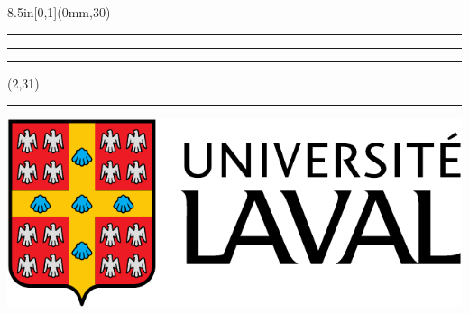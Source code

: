 \begingroup

\textblockorigin{0mm}{0mm}
\setlength{\parindent}{0mm}
\setlength{\banderougewidth}{2\TPHorizModule}
\setlength{\banderougeheight}{\TPVertModule}
\setlength{\bandeorwidth}{\TPHorizModule}
\setlength{\bandeorheight}{\banderougeheight}
\setlength{\imageheight}{29\TPVertModule}
\setlength{\logoheight}{2.5\TPVertModule}
\setlength{\gapwidth}{1.5pt}
\addtolength{\bandeorwidth}{-\gapwidth}
\addtolength{\imageheight}{-\gapwidth}

\begin{textblock*}{8.5in}[0,1](0mm,30\TPVertModule)
  \textcolor{rouge}{\rule{\banderougewidth}{\banderougeheight}}%
  \rule{\gapwidth}{0pt}%
  \textcolor{or}{\rule{\bandeorwidth}{\bandeorheight}}           %
\end{textblock*}

\begin{textblock*}{\TPHorizModule}(2\TPHorizModule,31\TPVertModule)
  \rule{\gapwidth}{0pt}%
  \includegraphics[height=\logoheight,keepaspectratio=true]{ul_p}
\end{textblock*}

